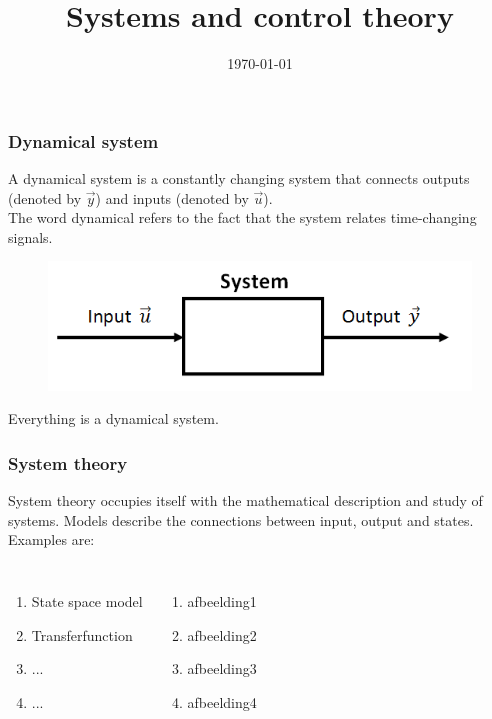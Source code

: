 \documentclass{beamer}
\title[Short title]{Systems and control theory} %
\author{} %
\institute[KU Leuven] %
{
Katholieke Universiteit Leuven \\ %
\medskip
\textit{} %
}
\date{\today} %
\begin{document}
\begin{frame}
\titlepage %
\end{frame}


\begin{frame}
\frametitle{Dynamical system}
A dynamical system is a constantly changing system that connects outputs (denoted by $\overrightarrow{y}$) and inputs (denoted by $\overrightarrow{u}$).\\The word dynamical refers to the fact that the system relates time-changing signals.
\begin{figure}
\includegraphics[width=0.8\linewidth]{Dynamical_system}
\end{figure}
\medskip
Everything is a dynamical system.
\end{frame}


\begin{frame}
\frametitle{System theory}
System theory occupies itself with the mathematical description and study of systems.
Models describe the connections between input, output and states.\\
Examples are:
\begin{columns}[c]
\begin{enumerate}
\item State space model
\item Transferfunction
\item ...
\item ...
\end{enumerate}

\begin{enumerate}
\item afbeelding1
\item afbeelding2
\item afbeelding3
\item afbeelding4
\end{enumerate}
\end{columns}
\end{frame}
\end{document}
